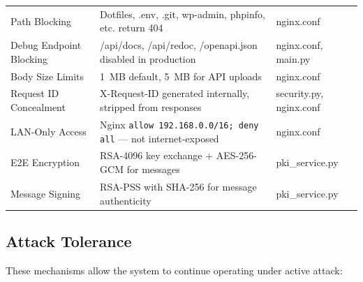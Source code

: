 \documentclass[12pt,a4paper]{article}
\begin{document}
\begin{center}
\begin{tabularx}{\textwidth}{lXl}
Path Blocking & Dotfiles, .env, .git, wp-admin, phpinfo, etc. return 404 & nginx.conf \\
Debug Endpoint Blocking & /api/docs, /api/redoc, /openapi.json disabled in production & nginx.conf, main.py \\
Body Size Limits & 1~MB default, 5~MB for API uploads & nginx.conf \\
Request ID Concealment & X-Request-ID generated internally, stripped from responses & security.py, nginx.conf \\
LAN-Only Access & Nginx \texttt{allow 192.168.0.0/16; deny all} — not internet-exposed & nginx.conf \\
E2E Encryption & RSA-4096 key exchange + AES-256-GCM for messages & pki\_service.py \\
Message Signing & RSA-PSS with SHA-256 for message authenticity & pki\_service.py \\
\bottomrule
\end{tabularx}
\end{center}

\subsection{Attack Tolerance}

These mechanisms allow the system to continue operating under active attack:
\end{document}
